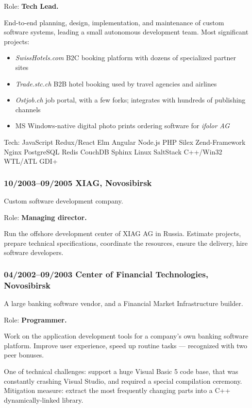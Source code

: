 \documentclass[a4paper, twocolumn, 10pt]{article}
\begin{document}
Role: \textbf{Tech Lead.}

End-to-end planning, design, implementation, and maintenance of custom software systems, leading a
small autonomous development team. Most significant projects:

\begin{itemize}
  \itemsep0em
  \item \emph{SwissHotels.com} B2C booking platform with dozens of specialized partner sites
  \item \emph{Trade.stc.ch} B2B hotel booking used by travel agencies and airlines
  \item \emph{Ostjob.ch} job portal, with a few forks; integrates with hundreds of publishing channels
  \item MS Windows-native digital photo prints ordering software for \emph{ifolor AG}
\end{itemize}

Tech: JavaScript Redux/React Elm Angular Node.js PHP Silex Zend-Framework Nginx PostgreSQL
Redis CouchDB Sphinx Linux SaltStack C++/Win32 WTL/ATL GDI+

\subsubsection*{10/2003--09/2005 XIAG, Novosibirsk}

Custom software development company.

Role: \textbf{Managing director.}

Run the offshore development center of XIAG AG in Russia. Estimate projects, prepare technical
specifications, coordinate the resources, ensure the delivery, hire software developers.

\subsubsection*{04/2002--09/2003 Center of Financial Technologies, Novosibirsk}

A large banking software vendor, and a Financial Market Infrastructure builder.

Role: \textbf{Programmer.}

Work on the application development tools for a company's own banking software platform. Improve
user experience, speed up routine tasks — recognized with two peer bonuses.

One of technical challenges: support a huge Visual Basic 5 code base, that was constantly crashing
Visual Studio, and required a special compilation ceremony. Mitigation measure: extract the most
frequently changing parts into a C++ dynamically-linked library.
\end{document}
